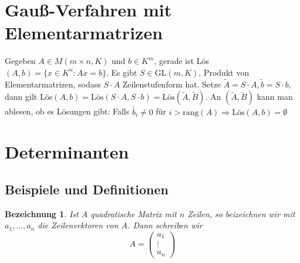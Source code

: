 \documentclass[12pt,a4paper]{article}
\theoremstyle{plain}
\newtheorem{bez}[Theorem]{Bezeichnung}
\numberwithin{equation}{section}
\begin{document}
\section{Gauß-Verfahren mit Elementarmatrizen}
Gegeben $A\in M(m\times n,K)$ und $b\in K^m$, gerade ist Lös$(A,b)=\{x\in K^n:Ax=b\}$. Es gibt $S\in $GL$(m,K)$, Produkt von Elementarmatrizen, sodass $S\cdot A$ Zeilenstufenform hat. Setze $\tilde{A}=S\cdot A, \tilde{b}=S\cdot b$, dann gilt Lös$(A,b)=\text{Lös}(S\cdot A, S\cdot b)=\text{Lös}(\tilde{A},\tilde{B})$. An $(\tilde{A},\tilde{B})$ kann man ablesen, ob es Lösungen gibt: Falls $\tilde{b_i}\neq 0$ für $i>\text{rang}(A) \Rightarrow \text{Lös}(A,b)=\emptyset$
\section{Determinanten}
\subsection{Beispiele und Definitionen}
\begin{bez}
Ist $A$ quadratische Matrix mit $n$ Zeilen, so beizeichnen wir mit $a_1,...,a_n$ die Zeilenvektoren von $A$. Dann schreiben wir
\[A=\begin{pmatrix} a_1\\\vdots\\a_n\end{pmatrix}\]
\end{bez}
\end{document}
